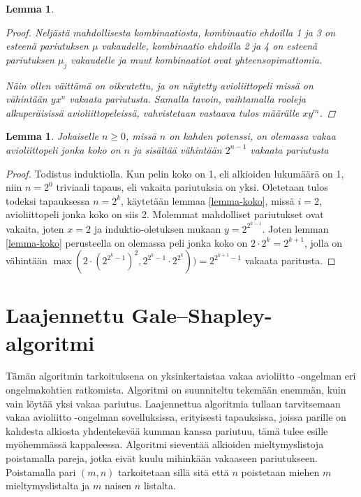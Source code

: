 \documentclass[finnish]{tktltiki2}
\newtheorem{lem}[lau]{Lemma}
\theoremstyle{definition}
\theoremstyle{remark}
\begin{document}
\begin{lem}
\begin{proof}
Neljästä mahdollisesta kombinaatiosta, kombinaatio ehdoilla 1 ja 3 on esteenä pariutuksen $\mu$ vakaudelle, kombinaatio ehdoilla 2 ja 4 on esteenä pariutuksen $\mu_j$ vakaudelle ja muut kombinaatiot ovat yhteensopimattomia.

Näin ollen väittämä on oikeutettu, ja on näytetty avioliittopeli missä on vähintään $yx^n$ vakaata pariutusta. Samalla tavoin, vaihtamalla rooleja alkuperäisissä avioliittopeleissä, vahvistetaan vastaava tulos määrälle $xy^m$.
\end{proof}
\end{lem}

\begin{lem}\cite[p. 24]{gusfield1989stable}
Jokaiselle $n \geq 0$, missä $n$ on kahden potenssi, on olemassa vakaa avioliittopeli jonka koko on $n$ ja sisältää vähintään $2^{n-1}$ vakaata pariutusta
\end{lem}
\begin{proof}
Todistus induktiolla. Kun pelin koko on 1, eli alkioiden lukumäärä on 1, niin $n = 2^0$ triviaali tapaus, eli vakaita pariutuksia on yksi. Oletetaan tulos todeksi tapauksessa $n = 2^k$, käytetään lemmaa \ref{lemma-koko}, missä $i = 2$, avioliittopeli jonka koko on siis 2. Molemmat mahdolliset pariutukset ovat vakaita, joten $x = 2$ ja induktio-oletuksen mukaan $y = 2^{2^{k-1}}$. Joten lemman \ref{lemma-koko} perusteella on olemassa peli jonka koko on $2 \cdot 2^k = 2^{k+1}$, jolla on vähintään $\max(2 \cdot (2^{2^{{k}}-1})^2, 2^{2^{k}-1} \cdot 2^{2^{k}})) = 2^{2^{k+1}-1}$ vakaata paritusta.
\end{proof}

\section{Laajennettu Gale--Shapley-algoritmi}
Tämän algoritmin tarkoituksena on yksinkertaistaa vakaa avioliitto -ongelman eri ongelmakohtien ratkomista. Algoritmi on suunniteltu tekemään enemmän, kuin vain löytää yksi vakaa pariutus. Laajennettua algoritmia tullaan tarvitsemaan vakaa avioliitto -ongelman sovelluksissa, erityisesti tapauksissa, joissa parille on kahdesta alkiosta yhdentekevää kumman kanssa pariutuu, tämä tulee esille myöhemmässä kappaleessa. Algoritmi sieventää alkioiden mieltymyslistoja poistamalla pareja, jotka eivät kuulu mihinkään vakaaseen pariutukseen. Poistamalla pari $(m, n)$ tarkoitetaan sillä sitä että $n$ poistetaan miehen $m$ mieltymyslistalta ja $m$ naisen $n$ listalta.
\end{document}
